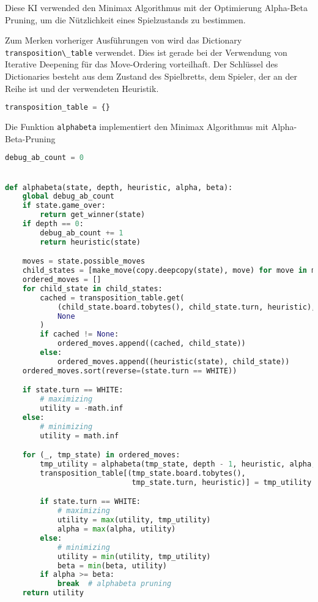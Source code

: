 Diese KI verwended den Minimax Algorithmus mit der Optimierung
Alpha-Beta Pruning, um die Nützlichkeit eines Spielzustands zu
bestimmen.

Zum Merken vorheriger Ausführungen von wird das Dictionary
\passthrough{\lstinline!transposition\_table!} verwendet. Dies ist
gerade bei der Verwendung von Iterative Deepening für das Move-Ordering
vorteilhaft. Der Schlüssel des Dictionaries besteht aus dem Zustand des
Spielbretts, dem Spieler, der an der Reihe ist und der verwendeten
Heuristik.

\begin{lstlisting}[language=Python]
transposition_table = {}
\end{lstlisting}

Die Funktion \passthrough{\lstinline!alphabeta!} implementiert den
Minimax Algorithmus mit Alpha-Beta-Pruning

\begin{lstlisting}[language=Python]
debug_ab_count = 0


def alphabeta(state, depth, heuristic, alpha, beta):
    global debug_ab_count
    if state.game_over:
        return get_winner(state)
    if depth == 0:
        debug_ab_count += 1
        return heuristic(state)

    moves = state.possible_moves
    child_states = [make_move(copy.deepcopy(state), move) for move in moves]
    ordered_moves = []
    for child_state in child_states:
        cached = transposition_table.get(
            (child_state.board.tobytes(), child_state.turn, heuristic),
            None
        )
        if cached != None:
            ordered_moves.append((cached, child_state))
        else:
            ordered_moves.append((heuristic(state), child_state))
    ordered_moves.sort(reverse=(state.turn == WHITE))

    if state.turn == WHITE:
        # maximizing
        utility = -math.inf
    else:
        # minimizing
        utility = math.inf

    for (_, tmp_state) in ordered_moves:
        tmp_utility = alphabeta(tmp_state, depth - 1, heuristic, alpha, beta)
        transposition_table[(tmp_state.board.tobytes(),
                             tmp_state.turn, heuristic)] = tmp_utility

        if state.turn == WHITE:
            # maximizing
            utility = max(utility, tmp_utility)
            alpha = max(alpha, utility)
        else:
            # minimizing
            utility = min(utility, tmp_utility)
            beta = min(beta, utility)
        if alpha >= beta:
            break  # alphabeta pruning
    return utility
\end{lstlisting}

